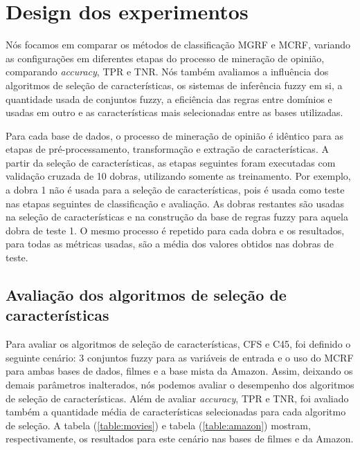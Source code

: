 \section{Design dos experimentos}

Nós focamos em comparar os métodos de classificação MGRF e MCRF, variando as configurações em diferentes etapas do processo de mineração de opinião, comparando \textit{accuracy}, TPR e TNR. Nós também avaliamos a influência dos algoritmos de seleção de características, os sistemas de inferência fuzzy em si, a quantidade usada de conjuntos fuzzy, a eficiência das regras entre domínios e usadas em outro e as características mais selecionadas entre as bases utilizadas. 

Para cada base de dados, o processo de mineração de opinião é idêntico para as etapas de pré-processamento, transformação e extração de características. A partir da seleção de características, as etapas seguintes foram executadas com validação cruzada de 10 dobras, utilizando somente as treinamento. Por exemplo, a dobra 1 não é usada para a seleção de características, pois é usada como teste nas etapas seguintes de classificação e avaliação. As dobras restantes são usadas na seleção de características e na construção da base de regras fuzzy para aquela dobra de teste 1. O mesmo processo é repetido para cada dobra e os resultados, para todas as métricas usadas, são a média dos valores obtidos nas dobras de teste. 

\subsection{Avaliação dos algoritmos de seleção de características}

Para avaliar os algoritmos de seleção de características, CFS e C45, foi definido o seguinte cenário: 3 conjuntos fuzzy para as variáveis de entrada e o uso do MCRF para ambas bases de dados, filmes e a base mista da Amazon. Assim, deixando os demais parâmetros inalterados, nós podemos avaliar o desempenho dos algoritmos de seleção de características. Além de avaliar \textit{accuracy}, TPR e TNR, foi avaliado também a quantidade média de características selecionadas para cada algoritmo de seleção. A tabela (\ref{table:movies}) e tabela (\ref{table:amazon}) mostram, respectivamente, os resultados para este cenário nas bases de filmes e da Amazon. 

